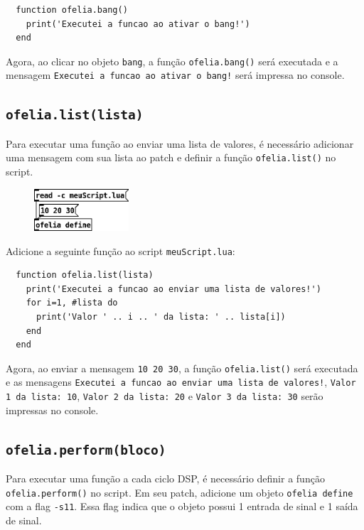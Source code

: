 \documentclass{article}
\begin{document}
\begin{center}
  \begin{lstlisting}
  function ofelia.bang()
    print('Executei a funcao ao ativar o bang!')
  end
  \end{lstlisting}
\end{center}

Agora, ao clicar no objeto \texttt{bang}, a função \texttt{ofelia.bang()} será executada e a mensagem \texttt{Executei a funcao ao ativar o bang!} será impressa no console.

\subsection{\texttt{ofelia.list(lista)}}

Para executar uma função ao enviar uma lista de valores, é necessário adicionar uma mensagem com sua lista ao patch e definir a função \texttt{ofelia.list()} no script.

\begin{figure}[H]
  \centering
  \includegraphics[width=100pt]{list.png}
\end{figure}

Adicione a seguinte função ao script \texttt{meuScript.lua}:

\begin{center}
  \begin{lstlisting}
  function ofelia.list(lista)
    print('Executei a funcao ao enviar uma lista de valores!')
    for i=1, #lista do
      print('Valor ' .. i .. ' da lista: ' .. lista[i])
    end
  end
  \end{lstlisting}
\end{center}

Agora, ao enviar a mensagem \texttt{10 20 30}, a função \texttt{ofelia.list()} será executada e as mensagens \texttt{Executei a funcao ao enviar uma lista de valores!}, \texttt{Valor 1 da lista: 10}, \texttt{Valor 2 da lista: 20} e \texttt{Valor 3 da lista: 30} serão impressas no console.

\subsection{\texttt{ofelia.perform(bloco)}}

Para executar uma função a cada ciclo DSP, é necessário definir a função \texttt{ofelia.perform()} no script.
Em seu patch, adicione um objeto \texttt{ofelia define} com a flag \texttt{-s11}. Essa flag indica que o objeto possui 1 entrada de sinal e 1 saída de sinal.
\end{document}
